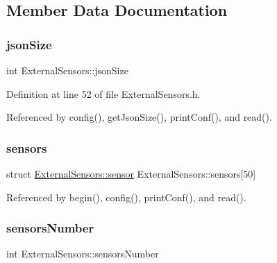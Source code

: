 \subsection{Member Data Documentation}
\mbox{\label{classExternalSensors_acacea86d74d967b57fcff282d26cff57}} 
\subsubsection{\texorpdfstring{json\+Size}{jsonSize}}
{\footnotesize\ttfamily int External\+Sensors\+::json\+Size\hspace{0.3cm}{\ttfamily [private]}}



Definition at line 52 of file External\+Sensors.\+h.



Referenced by config(), get\+Json\+Size(), print\+Conf(), and read().

\mbox{\label{classExternalSensors_a284233f884fcf00154a44740cf1d9e1e}} 
\subsubsection{\texorpdfstring{sensors}{sensors}}
{\footnotesize\ttfamily struct \hyperlink{structExternalSensors_1_1sensor}{External\+Sensors\+::sensor} External\+Sensors\+::sensors\mbox{[}50\mbox{]}\hspace{0.3cm}{\ttfamily [private]}}



Referenced by begin(), config(), print\+Conf(), and read().

\mbox{\label{classExternalSensors_a58e4fbf9adeae787d92be5fa33043b5d}} 
\subsubsection{\texorpdfstring{sensors\+Number}{sensorsNumber}}
{\footnotesize\ttfamily int External\+Sensors\+::sensors\+Number\hspace{0.3cm}{\ttfamily [private]}}



